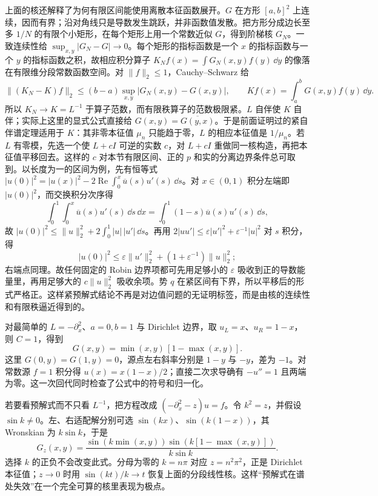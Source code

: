 上面的核还解释了为何有限区间能使用离散本征函数展开。\(G\) 在方形 \([a,b]^2\) 上连续，因而有界；沿对角线只是导数发生跳跃，并非函数值发散。把方形分成边长至多 \(1/N\) 的有限个小矩形，在每个矩形上用一个常数近似 \(G\)，得到阶梯核 \(G_N\)。一致连续性给 \(\sup_{x,y}|G_N-G|\to0\)。每个矩形的指标函数是一个 \(x\) 的指标函数与一个 \(y\) 的指标函数之积，故相应积分算子 \(K_Nf(x)=\int G_N(x,y)f(y)\,\dd y\) 的像落在有限维分段常数函数空间。对 \(\|f\|_2\le1\)，Cauchy--Schwarz 给
\[
 \|(K_N-K)f\|_2
 \le (b-a)\sup_{x,y}|G_N(x,y)-G(x,y)|,
 \qquad Kf(x)=\int_a^bG(x,y)f(y)\,\dd y.
\]
所以 \(K_N\to K=L^{-1}\) 于算子范数，而有限秩算子的范数极限紧。\(L\) 自伴使 \(K\) 自伴；实际上这里的显式公式直接给 \(G(x,y)=\overline{G(y,x)}\)。于是前面证明过的紧自伴谱定理适用于 \(K\)：其非零本征值 \(\mu_n\) 只能趋于零，\(L\) 的相应本征值是 \(1/\mu_n\)。若 \(L\) 有零模，先选一个使 \(L+cI\) 可逆的实数 \(c\)，对 \(L+cI\) 重做同一核构造，再把本征值平移回去。这样的 \(c\) 对本节有限区间、正的 \(p\) 和实的分离边界条件总可取到。以长度为一的区间为例，先有恒等式 \(|u(0)|^2=|u(x)|^2-2\operatorname{Re}\int_0^x\overline u(s)u'(s)\,\dd s\)。对 \(x\in(0,1)\) 积分左端即 \(|u(0)|^2\)，而交换积分次序得
\[
\int_0^1\int_0^x\overline u(s)u'(s)\,\dd s\,\dd x
=\int_0^1(1-s)\overline u(s)u'(s)\,\dd s,
\]
故 \(|u(0)|^2\le\|u\|_2^2+2\int_0^1|u|\,|u'|\,\dd s\)。再用 \(2|u u'|\le\varepsilon|u'|^2+\varepsilon^{-1}|u|^2\) 对 \(s\) 积分，得
\[
|u(0)|^2\le\varepsilon\|u'\|_2^2+(1+\varepsilon^{-1})\|u\|_2^2;
\]
右端点同理。故任何固定的 Robin 边界项都可先用足够小的 \(\varepsilon\) 吸收到正的导数能量里，再用足够大的 \(c\|u\|_2^2\) 吸收余项。势 \(q\) 在紧区间有下界，所以平移后的形式严格正。这样紧预解式结论不再是对边值问题的无证明标签，而是由核的连续性和有限秩逼近得到的。

对最简单的 \(L=-\partial_x^2\)、\(a=0,b=1\) 与 Dirichlet 边界，取 \(u_L=x\)、\(u_R=1-x\)，则 \(C=1\)，得到
\[
G(x,y)=\min(x,y)\,[1-\max(x,y)].
\]
这里 \(G(0,y)=G(1,y)=0\)，源点左右斜率分别是 \(1-y\) 与 \(-y\)，差为 \(-1\)。对常数源 \(f=1\) 积分得 \(u(x)=x(1-x)/2\)；直接二次求导确有 \(-u''=1\) 且两端为零。这一次回代同时检查了公式中的符号和归一化。

若要看预解式而不只看 \(L^{-1}\)，把方程改成 \((-\partial_x^2-z)u=f\)。令 \(k^2=z\)，并假设 \(\sin k\ne0\)。左、右适配解分别可选 \(\sin(kx)\)、\(\sin(k(1-x))\)，其 Wronskian 为 \(k\sin k\)，于是
\[
G_z(x,y)=\frac{\sin(k\min(x,y))\sin(k[1-\max(x,y)])}{k\sin k}.
\]
选择 \(k\) 的正负不会改变此式。分母为零的 \(k=n\pi\) 对应 \(z=n^2\pi^2\)，正是 Dirichlet 本征值；\(z\to0\) 时用 \(\sin(kt)/k\to t\) 恢复上面的分段线性核。这样“预解式在谱处失效”在一个完全可算的核里表现为极点。

